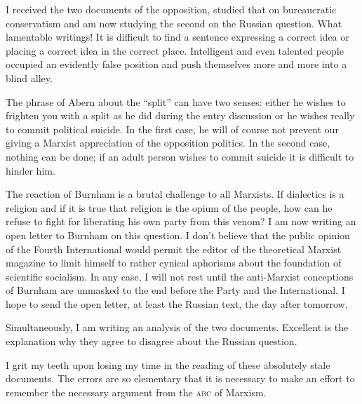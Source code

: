 I received the two documents of the opposition, studied that on bureaucratic conservatism and am now studying the second on the Russian question. What lamentable writings! It is difficult to find a sentence expressing a correct idea or placing a correct idea in the correct place. Intelligent and even talented people occupied an evidently false position and push themselves more and more into a blind alley.

The phrase of Abern about the “split” can have two senses: either he wishes to frighten you with a split as he did during the entry discussion or he wishes really to commit political suicide. In the first case, he will of course not prevent our giving a Marxist appreciation of the opposition politics. In the second case, nothing can be done; if an adult person wishes to commit suicide it is difficult to hinder him.

The reaction of Burnham is a brutal challenge to all Marxists. If dialectics is a religion and if it is true that religion is the opium of the people, how can he refuse to fight for liberating his own party from this venom? I am now writing an open letter to Burnham on this question. I don’t believe that the public opinion of the Fourth International would permit the editor of the theoretical Marxist magazine to limit himself to rather cynical aphorisms about the foundation of scientific socialism. In any case, I will not rest until the anti-Marxist conceptions of Burnham are unmasked to the end before the Party and the International. I hope to send the open letter, at least the Russian text, the day after tomorrow.

Simultaneously, I am writing an analysis of the two documents. Excellent is the explanation why they agree to disagree about the Russian question.

I grit my teeth upon losing my time in the reading of these absolutely stale documents. The errors are so elementary that it is necessary to make an effort to remember the necessary argument from the \textsc{abc} of Marxism.


